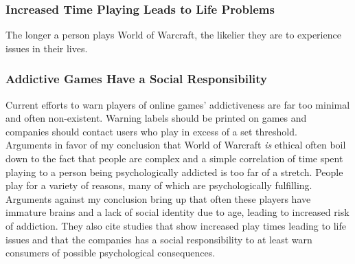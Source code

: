 \documentclass[11pt]{article}
\begin{document}
\begin{multicols}{2}
\subsubsection{Increased Time Playing Leads to Life Problems}
The longer a person plays World of Warcraft, the likelier they are to experience issues in their lives. \cite{ProblemUsageAmongHighlyEngagedPlayers}
\subsubsection{Addictive Games Have a Social Responsibility}
Current efforts to warn players of online games' addictiveness are far too minimal and often non-existent. Warning labels should be printed on games and companies should contact users who play in excess of a set threshold. \cite{MMORPGSocialResponsibility}\\

Arguments in favor of my conclusion that World of Warcraft \emph{is} ethical often boil down to the fact that people are complex and a simple correlation of time spent playing to a person being psychologically addicted is too far of a stretch. People play for a variety of reasons, many of which are psychologically fulfilling. Arguments against my conclusion bring up that often these players have immature brains and a lack of social identity due to age, leading to increased risk of addiction. They also cite studies that show increased play times leading to life issues and that the companies has a social responsibility to at least warn consumers of possible psychological consequences.




\end{multicols}
\end{document}
